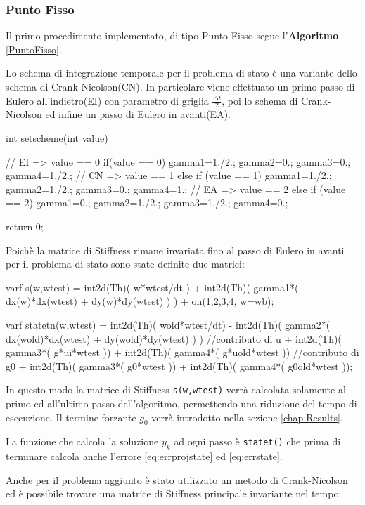 \subsubsection{Punto Fisso}
Il primo procedimento implementato, di tipo Punto Fisso segue l'\textbf{Algoritmo} \ref{PuntoFisso}.
\par
Lo schema di integrazione temporale per il problema di stato è una variante dello schema di Crank-Nicolson(CN). In particolare viene effettuato un primo passo di Eulero all'indietro(EI) con parametro di griglia $\frac{{\Delta}t}{2}$, poi lo schema di Crank-Nicolson ed infine un passo di Eulero in avanti(EA).
\begin{Code}[caption={Funzione \texttt{setscheme()}}]
int setscheme(int value)
{
	// EI => value == 0
	if(value == 0)
	{
	    gamma1=1./2.;
	    gamma2=0.;
	    gamma3=0.;
	    gamma4=1./2.;
	}
	// CN => value == 1
	else if (value == 1)
	{	
		gamma1=1./2.;
	    gamma2=1./2.;
	    gamma3=0.;
	    gamma4=1.;
	}
	// EA => value == 2
	else if (value == 2)
	{
		gamma1=0.;
	    gamma2=1./2.;
	    gamma3=1./2.;
	    gamma4=0.;
	}
	
	return 0;
}
\end{Code}
Poichè la matrice di Stiffness rimane invariata fino al passo di Eulero in avanti per il problema di stato sono state definite due matrici:
\begin{Code}[caption={Matrici \texttt{s(w,wtest)} e \texttt{statetn(w,wtest)}}]
varf s(w,wtest) =   int2d(Th)( w*wtest/dt )
	        	  + int2d(Th)( gamma1*( dx(w)*dx(wtest) + dy(w)*dy(wtest) ) )
				  + on(1,2,3,4, w=wb);

varf statetn(w,wtest) =   int2d(Th)( wold*wtest/dt)
				  		- int2d(Th)( gamma2*(   dx(wold)*dx(wtest) 
				  							 + dy(wold)*dy(wtest) ) )
							//contributo di u
						+ int2d(Th)( gamma3*( g*ui*wtest ))
				 		+ int2d(Th)( gamma4*( g*uold*wtest ))
							//contributo di g0
						+ int2d(Th)( gamma3*( g0*wtest ))
				 		+ int2d(Th)( gamma4*( g0old*wtest ));
\end{Code}
In questo modo la matrice di Stiffness \texttt{s(w,wtest)} verrà calcolata solamente al primo ed all'ultimo passo dell'algoritmo, permettendo una riduzione del tempo di esecuzione. Il termine forzante $g_0$ verrà introdotto nella sezione \ref{chap:Results}.
\par
La funzione che calcola la soluzione $y_k$ ad ogni passo è \texttt{statet()} che prima di terminare calcola anche l'errore \eqref{eq:errprojstate} ed \eqref{eq:errstate}.
\par
Anche per il problema aggiunto è stato utilizzato un metodo di Crank-Nicolson ed è possibile trovare una matrice di Stiffness principale invariante nel tempo:
